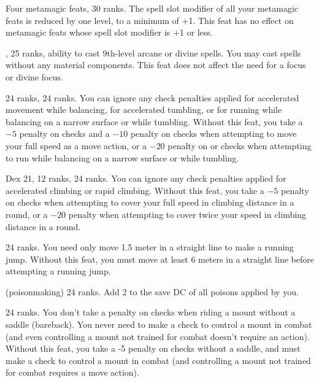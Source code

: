 {Four metamagic feats,  30 ranks.}
{The spell slot modifier of all your metamagic feats is reduced by one level, to a minimum of +1. This feat has no effect on metamagic feats whose spell slot modifier is +1 or less.}

{,  25 ranks, ability to cast 9th-level arcane or divine spells.}
{You may cast spells without any material components. This feat does not affect the need for a focus or divine focus.}

{}
{ 24 ranks,  24 ranks.}
{You can ignore any check penalties applied for accelerated movement while balancing, for accelerated tumbling, or for running while balancing on a narrow surface or while tumbling.}
{Without this feat, you take a $-5$ penalty on  checks and a $-10$ penalty on  checks when attempting to move your full speed as a move action, or a $-20$ penalty on  or  checks when attempting to run while balancing on a narrow surface or while tumbling.}{}

{}
{Dex 21,  12 ranks,  24 ranks.}
{You can ignore any check penalties applied for accelerated climbing or rapid climbing.}
{Without this feat, you take a $-5$ penalty on  checks when attempting to cover your full speed in climbing distance in a round, or a $-20$ penalty when attempting to cover twice your speed in climbing distance in a round.}{}

{}
{ 24 ranks.}
{You need only move 1.5 meter in a straight line to make a running jump.}
{Without this feat, you must move at least 6 meters in a straight line before attempting a running jump.}{}

{ (poisonmaking) 24 ranks.}
{Add 2 to the save DC of all poisons applied by you.}

{}
{ 24 ranks.}
{You don't take a penalty on  checks when riding a mount without a saddle (bareback). You never need to make a  check to control a mount in combat (and even controlling a mount not trained for combat doesn't require an action).}
{Without this feat, you take a -5 penalty on  checks without a saddle, and must make a  check to control a mount in combat (and controlling a mount not trained for combat requires a move action).}{}

